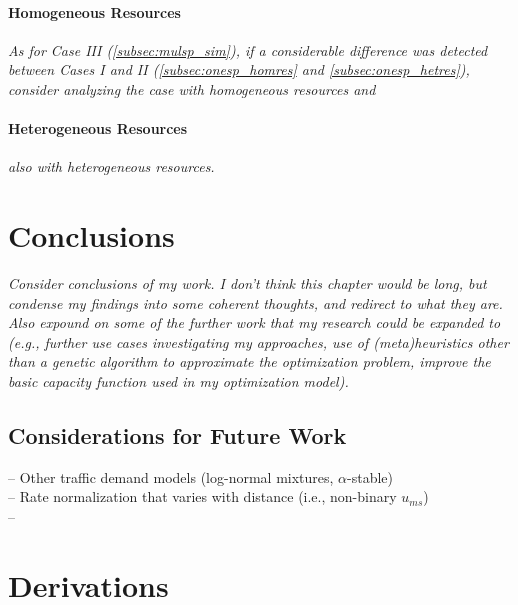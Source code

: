 \documentclass[12pt,dvipsnames]{report}
\begin{document}
\subsubsection{Homogeneous Resources} \label{subsubsec:mulsp_spec_homres}

\textit{As for Case III (\ref{subsec:mulsp_sim}), if a considerable difference was detected between Cases I and II (\ref{subsec:onesp_homres} and \ref{subsec:onesp_hetres}), consider analyzing the case with homogeneous resources and}

\subsubsection{Heterogeneous Resources} \label{subsubsec:mulsp_spec_hetres}

\textit{also with heterogeneous resources.}
\fi

\iftrue
\pagebreak
\chapter{Conclusions} \label{ch:conc}

%
\textit{Consider conclusions of my work.  I don't think this chapter would be long, but condense my findings into some coherent thoughts, and redirect to what they are.  Also expound on some of the further work that my research could be expanded to (e.g., further use cases investigating my approaches, use of (meta)heuristics other than a genetic algorithm to approximate the optimization problem, improve the basic capacity function used in my optimization model).}

\section{Considerations for Future Work} \label{sec:futurework}


-- Other traffic demand models (log-normal mixtures, $\alpha$-stable)\\%
-- Rate normalization that varies with distance (i.e., non-binary $u_{ms}$)\\%
--
\fi

\iffalse
\pagebreak
\chapter{Derivations} \label{ch:derive}
\end{document}
